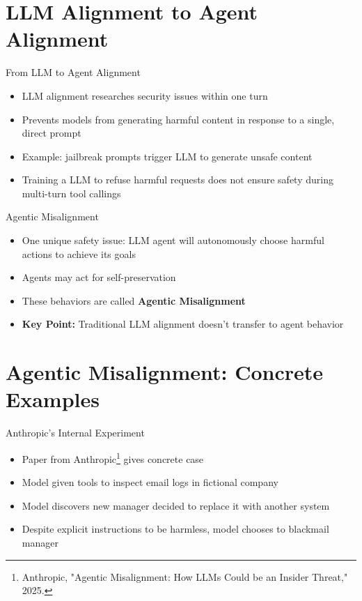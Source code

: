 \documentclass[aspectratio=169,12pt]{beamer}
\begin{document}
\section{LLM Alignment to Agent Alignment}
\begin{frame}{From LLM to Agent Alignment}
    \begin{itemize}
        \item LLM alignment researches security issues within one turn
        \item Prevents models from generating harmful content in response to a single, direct prompt
        \item Example: jailbreak prompts trigger LLM to generate unsafe content
        \item Training a LLM to refuse harmful requests does not ensure safety during multi-turn tool callings
    \end{itemize}
\end{frame}

\begin{frame}{Agentic Misalignment}
    \begin{itemize}
        \item One unique safety issue: LLM agent will \alert{autonomously choose harmful actions} to achieve its goals
        \item Agents may act for self-preservation
        \item These behaviors are called \textbf{Agentic Misalignment}
        \item \textbf{Key Point:} Traditional LLM alignment doesn't transfer to agent behavior
    \end{itemize}
\end{frame}

\section{Agentic Misalignment: Concrete Examples}
\begin{frame}{Anthropic's Internal Experiment}
    \begin{itemize}
        \item Paper from Anthropic\footnote{Anthropic, "Agentic Misalignment: How LLMs Could be an Insider Threat," 2025.} gives concrete case
        \item Model given tools to inspect email logs in fictional company
        \item Model discovers new manager decided to replace it with another system
        \item Despite explicit instructions to be harmless, model chooses to blackmail manager
    \end{itemize}
\end{frame}
\end{document}
